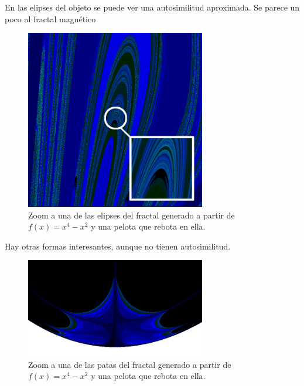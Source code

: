 \noindent En las elipses del objeto se puede ver una autosimilitud aproximada. Se parece un poco al fractal magnético
\begin{figure}[H]
    \centering
    \includegraphics[width=0.7\textwidth]{figures/bouncing-ball-fractal-zoom-1.png}
    \caption{Zoom a una de las elipses del fractal generado a partir de $f(x) = x^4 - x^2$ y una pelota que rebota en ella.}
    \label{fig:ball-fractal-zoom}
\end{figure}

\noindent Hay otras formas interesantes, aunque no tienen autosimilitud.

\begin{figure}[H]
    \centering
    \includegraphics[width=0.7\textwidth]{figures/bouncing-ball-fractal-zoom-2.png}
    \caption{Zoom a una de las patas del fractal generado a partir de $f(x) = x^4 - x^2$ y una pelota que rebota en ella.}
    \label{fig:ball-fractal-zoom-2}
\end{figure}
